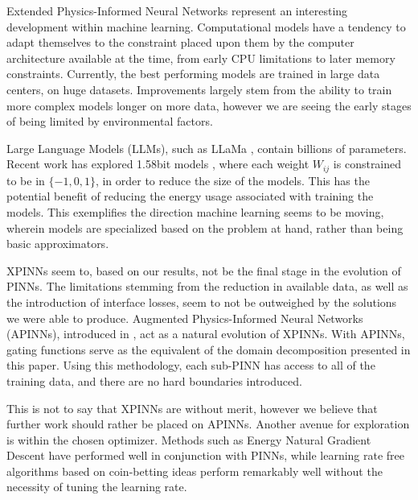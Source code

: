 Extended Physics-Informed Neural Networks represent an interesting development within machine learning.
Computational models have a tendency to adapt themselves to the constraint placed upon them by the computer architecture available at the time, from early CPU limitations to later memory constraints.
Currently, the best performing models are trained in large data centers, on huge datasets.
Improvements largely stem from the ability to train more complex models longer on more data, however we are seeing the early stages of being limited by environmental factors.

Large Language Models (LLMs), such as LLaMa \cite{touvron2023llama}, contain billions of parameters.
Recent work has explored 1.58bit models \cite{ma2024era}, where each weight $W_{ij}$ is constrained to be in $\{-1, 0, 1\}$, in order to reduce the size of the models.
This has the potential benefit of reducing the energy usage associated with training the models.
This exemplifies the direction machine learning seems to be moving, wherein models are specialized based on the problem at hand, rather than being basic approximators.

XPINNs seem to, based on our results, not be the final stage in the evolution of PINNs.
The limitations stemming from the reduction in available data, as well as the introduction of interface losses, seem to not be outweighed by the solutions we were able to produce.
Augmented Physics-Informed Neural Networks (APINNs), introduced in \textcite{Hu_2023}, act as a natural evolution of XPINNs.
With APINNs, gating functions serve as the equivalent of the domain decomposition presented in this paper.
Using this methodology, each sub-PINN has access to all of the training data, and there are no hard boundaries introduced.

This is not to say that XPINNs are without merit, however we believe that further work should rather be placed on APINNs.
Another avenue for exploration is within the chosen optimizer.
Methods such as Energy Natural Gradient Descent \cite{müller2023achieving} have performed well in conjunction with PINNs, while learning rate free algorithms based on coin-betting ideas \cite{sharrock2023learning} perform remarkably well without the necessity of tuning the learning rate.
